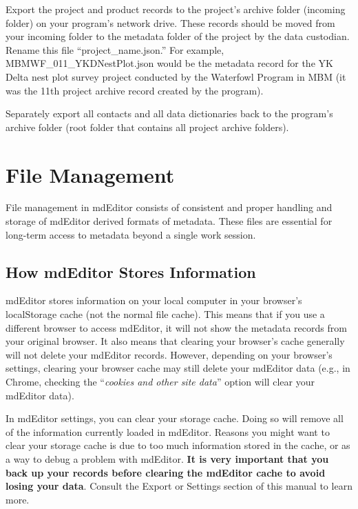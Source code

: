 \documentclass[
]{book}
\makeatletter
\newenvironment{kframe}{%
\medskip{}
\setlength{\fboxsep}{.8em}
 \def\at@end@of@kframe{}%
 \ifinner\ifhmode%
  \def\at@end@of@kframe{\end{minipage}}%
  \begin{minipage}{\columnwidth}%
 \fi\fi%
 \def\FrameCommand##1{\hskip\@totalleftmargin \hskip-\fboxsep
 \colorbox{shadecolor}{##1}\hskip-\fboxsep
     \hskip-\linewidth \hskip-\@totalleftmargin \hskip\columnwidth}%
 \MakeFramed {\advance\hsize-\width
   \@totalleftmargin\z@ \linewidth\hsize
   \@setminipage}}%
 {\par\unskip\endMakeFramed%
 \at@end@of@kframe}
\newenvironment{rmdblock}[1]
  {
  \begin{itemize}
  \renewcommand{\labelitemi}{
    \raisebox{-.7\height}[0pt][0pt]{
      {\setkeys{Gin}{width=3em,keepaspectratio}\texttt{[image: images/\#1]}}
    }
  }
  \setlength{\fboxsep}{1em}
  \begin{kframe}
  \item
  }
  {
  \end{kframe}
  \end{itemize}
  }
\newenvironment{rmdcaution}
  {\begin{rmdblock}{caution}}
  {\end{rmdblock}}
\makeatother
\begin{document}
Export the project and product records to the project's archive folder (incoming folder) on your program's network drive. These records should be moved from your incoming folder to the metadata folder of the project by the data custodian. Rename this file ``project\_name.json.'' For example, MBMWF\_011\_YKDNestPlot.json would be the metadata record for the YK Delta nest plot survey project conducted by the Waterfowl Program in MBM (it was the 11th project archive record created by the program).

Separately export all contacts and all data dictionaries back to the program's archive folder (root folder that contains all project archive folders).

\hypertarget{file-management}{%
\chapter{File Management}\label{file-management}}

File management in mdEditor consists of consistent and proper handling and storage of mdEditor derived formats of metadata. These files are essential for long-term access to metadata beyond a single work session.

\hypertarget{how-mdeditor-stores-information}{%
\section{How mdEditor Stores Information}\label{how-mdeditor-stores-information}}

mdEditor stores information on your local computer in your browser's localStorage cache (not the normal file cache). This means that if you use a different browser to access mdEditor, it will not show the metadata records from your original browser. It also means that clearing your browser's cache generally will not delete your mdEditor records. However, depending on your browser's settings, clearing your browser cache may still delete your mdEditor data (e.g., in Chrome, checking the ``\emph{cookies and other site data}'' option will clear your mdEditor data).

\begin{rmdcaution}
In mdEditor settings, you can clear your storage cache. Doing so will
remove all of the information currently loaded in mdEditor. Reasons you
might want to clear your storage cache is due to too much information
stored in the cache, or as a way to debug a problem with mdEditor.
\textbf{It is very important that you back up your records before
clearing the mdEditor cache to avoid losing your data}. Consult the
Export or Settings section of this manual to learn more.
\end{rmdcaution}
\end{document}
